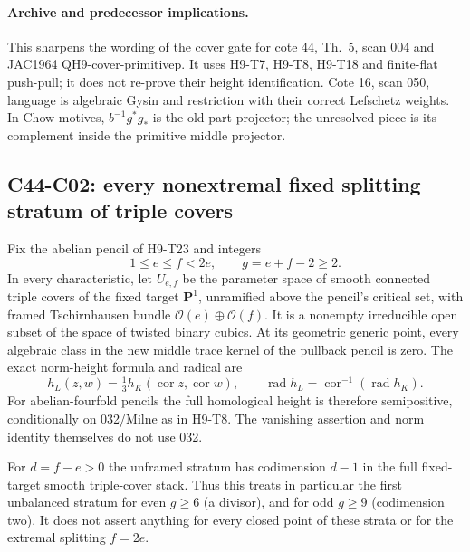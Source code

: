 \paragraph{Archive and predecessor implications.}
This sharpens the wording of the cover gate for cote 44, Th.~5,
scan 004 and JAC1964 QH9-cover-primitivep. It uses H9-T7, H9-T8,
H9-T18 and finite-flat push-pull; it does not re-prove their height
identification. Cote 16, scan 050, language is algebraic Gysin and
restriction with their correct Lefschetz weights. In Chow motives,
$b^{-1}g^*g_*$ is the old-part projector; the unresolved piece is its
complement inside the primitive middle projector.

\subsection{C44-C02: every nonextremal fixed splitting stratum of triple covers}
\begin{theorem}[C44-C02]\label{thm:maroni}
Fix the abelian pencil of H9-T23 and integers
\[
                  1\le e\le f<2e,
                  \qquad g=e+f-2\ge2.
\]
In every characteristic, let $U_{e,f}$ be the parameter space of smooth
connected triple covers of the fixed target $\mathbf P^1$, unramified
above the pencil's critical set, with framed Tschirnhausen bundle
$\mathcal O(e)\oplus\mathcal O(f)$. It is a nonempty irreducible open
subset of the space of twisted binary cubics. At its geometric generic
point, every algebraic class in the new middle trace kernel of the
pullback pencil is zero. The exact norm-height formula and radical are
\[
 h_L(z,w)=\tfrac13h_K(\operatorname{cor}z,\operatorname{cor}w),
 \qquad \operatorname{rad}h_L=
       \operatorname{cor}^{-1}(\operatorname{rad}h_K).       \tag{C44.C02.1}
\]
For abelian-fourfold pencils the full homological height is therefore
semipositive, conditionally on 032/Milne as in H9-T8. The vanishing
assertion and norm identity themselves do not use 032.

For $d=f-e>0$ the unframed stratum has codimension $d-1$ in the full
fixed-target smooth triple-cover stack. Thus this treats in particular
the first unbalanced stratum for even $g\ge6$ (a divisor), and for odd
$g\ge9$ (codimension two). It does not assert anything for every closed
point of these strata or for the extremal splitting $f=2e$.
\end{theorem}
